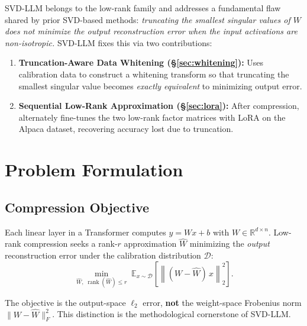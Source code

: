 \documentclass[11pt,a4paper]{article}
\DeclareMathOperator{\rank}{rank}
\newcommand{\Rbb}{\mathbb{R}}
\newcommand{\Ebb}{\mathbb{E}}
\newcommand{\norm}[1]{\left\|#1\right\|}
\theoremstyle{remark}
\begin{document}
SVD-LLM belongs to the low-rank family and addresses a fundamental flaw shared
by prior SVD-based methods: \emph{truncating the smallest singular values of
$W$ does not minimize the output reconstruction error when the input
activations are non-isotropic.}  SVD-LLM fixes this via two contributions:

\begin{enumerate}[label=\textbf{\arabic*.}]
  \item \textbf{Truncation-Aware Data Whitening (\S\ref{sec:whitening}):}
    Uses calibration data to construct a whitening transform so that
    truncating the smallest singular value becomes \emph{exactly equivalent}
    to minimizing output error.

  \item \textbf{Sequential Low-Rank Approximation (\S\ref{sec:lora}):}
    After compression, alternately fine-tunes the two low-rank factor
    matrices with LoRA on the Alpaca dataset, recovering accuracy lost due
    to truncation.
\end{enumerate}

\section{Problem Formulation}
\label{sec:problem}

\subsection{Compression Objective}

Each linear layer in a Transformer computes $y = Wx + b$ with
$W \in \Rbb^{d \times n}$.  Low-rank compression seeks a rank-$r$
approximation $\hat{W}$ minimizing the \emph{output} reconstruction error
under the calibration distribution $\mathcal{D}$:
\begin{equation}
  \label{eq:obj}
  \min_{\hat{W},\;\rank(\hat{W})\le r}
  \;\Ebb_{x\sim\mathcal{D}}\!\left[\norm{(W - \hat{W})\,x}_2^2\right].
\end{equation}

\begin{tcolorbox}[keybox={Key distinction}]
The objective is the output-space $\ell_2$ error, \textbf{not} the
weight-space Frobenius norm $\|W-\hat{W}\|_F^2$.  This distinction is the
methodological cornerstone of SVD-LLM.
\end{tcolorbox}
\end{document}
